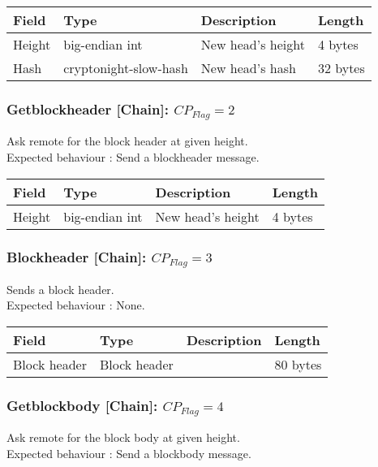 \documentclass[a4paper,10pt]{article}
\begin{document}
                \noindent\begin{tabularx}{\textwidth}{|l|l|X|l|}
                    \hline Field & Type & Description & Length \\ \hline
                    \hline Height & big-endian int & New head's height & 4 bytes \\
                    \hline Hash & cryptonight-slow-hash & New head's hash & 32 bytes\\
                    \hline
                \end{tabularx}

            \subsubsection{Getblockheader [Chain]: $CP_{Flag} = 2$}
                Ask remote for the block header at given height.\\
                Expected behaviour : Send a blockheader message.\\
                
                \noindent\begin{tabularx}{\textwidth}{|l|l|X|l|}
                    \hline Field & Type & Description & Length \\ \hline
                    \hline Height & big-endian int & New head's height & 4 bytes \\
                    \hline
                \end{tabularx}
            
            \subsubsection{Blockheader [Chain]: $CP_{Flag} = 3$}
                Sends a block header.\\
                Expected behaviour : None.\\
                
                \noindent\begin{tabularx}{\textwidth}{|l|l|X|l|}
                    \hline Field & Type & Description & Length \\ \hline
                    \hline Block header & Block header &  & 80 bytes \\
                    \hline
                \end{tabularx}

            \subsubsection{Getblockbody [Chain]: $CP_{Flag} = 4$}
                Ask remote for the block body at given height.\\
                Expected behaviour : Send a blockbody message.\\
                
\end{document}
